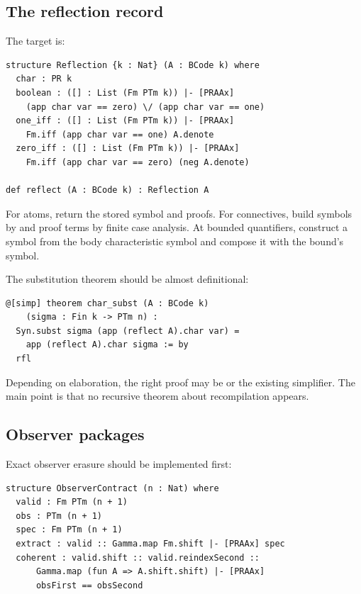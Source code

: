 \subsection{The reflection record}

The target is:

\begin{lstlisting}
structure Reflection {k : Nat} (A : BCode k) where
  char : PR k
  boolean : ([] : List (Fm PTm k)) |- [PRAAx]
    (app char var == zero) \/ (app char var == one)
  one_iff : ([] : List (Fm PTm k)) |- [PRAAx]
    Fm.iff (app char var == one) A.denote
  zero_iff : ([] : List (Fm PTm k)) |- [PRAAx]
    Fm.iff (app char var == zero) (neg A.denote)

def reflect (A : BCode k) : Reflection A
\end{lstlisting}

For atoms, return the stored symbol and proofs.  For connectives, build symbols
by  and proof terms by finite case analysis.  At bounded
quantifiers, construct a  symbol from the body characteristic
symbol and compose it with the bound's  symbol.

The substitution theorem should be almost definitional:

\begin{lstlisting}
@[simp] theorem char_subst (A : BCode k)
    (sigma : Fin k -> PTm n) :
  Syn.subst sigma (app (reflect A).char var) =
    app (reflect A).char sigma := by
  rfl
\end{lstlisting}

Depending on elaboration, the right proof may be  or the existing
 simplifier.  The main point is that no recursive theorem
about recompilation appears.

\subsection{Observer packages}

Exact observer erasure should be implemented first:

\begin{lstlisting}
structure ObserverContract (n : Nat) where
  valid : Fm PTm (n + 1)
  obs : PTm (n + 1)
  spec : Fm PTm (n + 1)
  extract : valid :: Gamma.map Fm.shift |- [PRAAx] spec
  coherent : valid.shift :: valid.reindexSecond ::
      Gamma.map (fun A => A.shift.shift) |- [PRAAx]
      obsFirst == obsSecond
\end{lstlisting}

